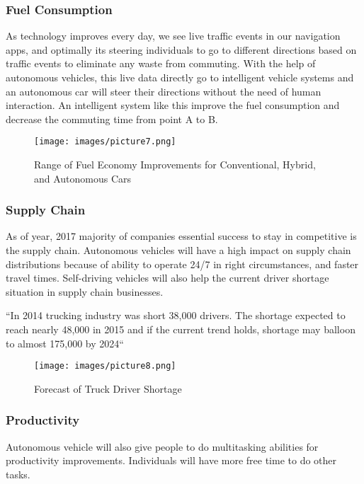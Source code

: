 \documentclass{acmart}
\begin{document}
\subsubsection{Fuel Consumption}As technology improves every day, we see live traffic events in our navigation apps, and optimally its steering individuals to go to different directions based on traffic events to eliminate any waste from commuting. With the help of autonomous vehicles, this live data directly go to intelligent vehicle systems and an autonomous car will steer their directions without the need of human interaction. An intelligent system like this improve the fuel consumption and decrease the commuting time from point A to B.

\begin{figure}[!ht]
  \centering
      \texttt{[image: images/picture7.png]}
  \caption{Range of Fuel Economy Improvements for Conventional, Hybrid, and Autonomous Cars}\label{F:fuelconsumption}
\end{figure}

\subsubsection{Supply Chain} As of year, 2017 majority of companies essential success to stay in competitive is the supply chain.  Autonomous vehicles will have a high impact on supply chain distributions because of ability to operate 24/7 in right circumstances, and faster travel times. Self-driving vehicles will also help the current driver shortage situation in supply chain businesses.

\begin{center}
    ``In 2014 trucking industry was short 38,000 drivers. The shortage expected to reach nearly 48,000 in 2015 and if the current trend holds, shortage may balloon to almost 175,000 by 2024``\cite{ATA}
\end{center}

\begin{figure}[h]
  \centering
      \texttt{[image: images/picture8.png]}
  \caption{Forecast of Truck Driver Shortage}\label{F:small}
\end{figure}

\subsubsection{Productivity}Autonomous vehicle will also give people to do multitasking abilities for productivity improvements. Individuals will have more free time to do other tasks. 
\end{document}
